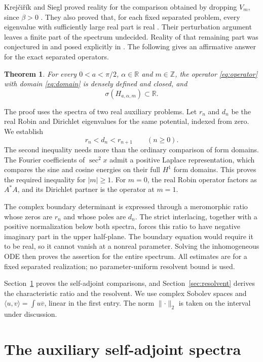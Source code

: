 \documentclass[11pt]{article}
\newtheorem{theorem}{Theorem}[section]
\newcommand{\R}{\mathbb R}
\newcommand{\norm}[1]{\lVert#1\rVert}
\begin{document}
Krej\v{c}i\v{r}\'{i}k and Siegl proved reality for the comparison obtained
by dropping $V_m$, since $\beta>0$ \cite[Proposition 4.3]{KS}.
They also proved that, for each fixed separated problem, every
eigenvalue with sufficiently large real part is real
\cite[Proposition 4.4]{KS}. Their perturbation argument leaves a finite
part of the spectrum undecided. Reality of that remaining part was
conjectured in \cite[Remark 4.6]{KS} and posed explicitly in \cite{S}.
The following gives an affirmative answer for the exact separated
operators.

\begin{theorem}\label{thm:main}
For every $0<a<\pi/2$, $\alpha\in\R$ and $m\in\mathbb Z$, the operator
\eqref{eq:operator} with domain \eqref{eq:domain} is densely defined
and closed, and
\[
 \sigma(H_{a,\alpha,m})\subset\R.
\]
\end{theorem}

The proof uses the spectra of two real auxiliary problems. Let $r_n$
and $d_n$ be the real Robin and Dirichlet eigenvalues for the same
potential, indexed from zero. We establish
\[
 r_n<d_n<r_{n+1}\qquad(n\geq0).
\]
The second inequality needs more than the ordinary comparison of form
domains. The Fourier coefficients of $\sec^2x$ admit a positive Laplace
representation, which compares the sine and cosine energies on their
full $H^1$ form domains. This proves the required inequality for
$|m|\geq1$. For $m=0$, the real Robin operator factors as $A^*A$,
and its Dirichlet partner is the operator at $m=1$.

The complex boundary determinant is expressed through a meromorphic
ratio whose zeros are $r_n$ and whose poles are $d_n$.
The strict interlacing, together with a positive normalization below
both spectra, forces this ratio to have negative imaginary part in the
upper half-plane. The boundary equation would require it to be real,
so it cannot vanish at a nonreal parameter. Solving the inhomogeneous
ODE then proves the assertion for the entire spectrum.
All estimates are for a fixed separated realization; no parameter-uniform
resolvent bound is used.

Section~\ref{sec:interlace} proves the self-adjoint comparisons, and
Section~\ref{sec:resolvent} derives the characteristic ratio and the
resolvent. We use complex Sobolev spaces and
$\langle u,v\rangle=\int u\overline v$, linear in the first entry.
The norm $\norm{\cdot}_2$ is taken on the interval under discussion.


\section{The auxiliary self-adjoint spectra}\label{sec:interlace}
\end{document}

